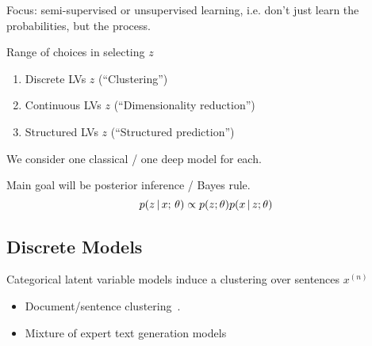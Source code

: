 \begin{frame}
    Focus: semi-supervised or unsupervised learning, i.e. don't just learn the probabilities, but the process.
    \vspace{0.5cm}
    
    Range of choices in selecting $z$ 
    \begin{enumerate}
        \item Discrete LVs $z$ (``Clustering'')
        \item Continuous LVs $z$ (``Dimensionality reduction'')
        \item Structured LVs $z$ (``Structured prediction'')
    \end{enumerate}
    We consider one classical / one deep model for each.
    
    
    \vspace{0.5cm}
    Main goal will be posterior inference / Bayes rule.
    \[ p(z \,|\, x ; \, \theta ) \propto p(z; \theta) p(x \,|\, z ;\theta) \]
\end{frame}

\subsection{Discrete Models}
\begin{frame}

\begin{center}
\end{center}



Categorical latent variable models induce a clustering over sentences $x^{(n)}$

 \begin{itemize}
     \item Document/sentence clustering~\citep{willett1988recent,aggarwal2012survey}.
     \item Mixture of expert text generation models~\citep{jacobs1991adaptive,garmash2016ensemble,lee2016stochastic}
 \end{itemize}

\end{frame}

